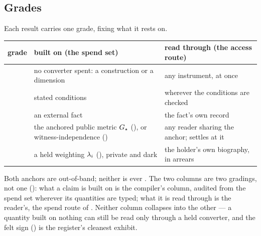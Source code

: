 \documentclass[../main]{subfiles}
\begin{document}
\subsection{Grades}
\label{subsec:gen:grades}
%
Each result carries one grade, fixing what it rests on.

\begin{table}[htbp]
  \centering
  \begin{tabularx}{\textwidth}{@{} l L L @{}}
    \toprule
    \textbf{grade} & \textbf{built on} (the spend set) & \textbf{read through} (the access route) \\
    \midrule
           & no converter spent: a construction or a dimension
                          & any instrument, at once \\
          & stated conditions & wherever the conditions are checked \\
          & an external fact & the fact's own record \\
     & the anchored public metric $G\sb{\star}$ (),
                            or witness-independence ()
                          & any reader sharing the anchor; settles at it \\
     & a held weighting $\lambda\sb{i}$ (), private and dark
                          & the holder's own biography, in arrears \\
    \bottomrule
  \end{tabularx}
\end{table}

\noindent Both anchors are out-of-band; neither is ever . The two columns
are two gradings, not one (): what a claim is built on is the compiler's
column, audited from the spend set wherever its quantities are typed; what it is read
through is the reader's, the spend
route of . Neither column collapses into the other --- a quantity
built on nothing can still be read only through a held converter, and the felt sign
() is the register's cleanest exhibit.
\end{document}
